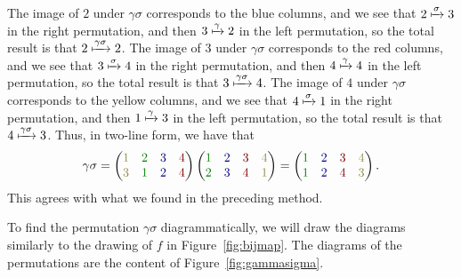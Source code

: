 \begin{example}
\[    \]
    The image of $2$ under $\gamma\sigma$ corresponds to the blue columns, and we see that $2 \xmapsto{\sigma} 3$ in the right permutation, and then $3 \xmapsto{\gamma} 2$ in the left permutation, so the total result is that $2 \xmapsto{\gamma\sigma} 2$. The image of $3$ under $\gamma\sigma$ corresponds to the red columns, and we see that $3 \xmapsto{\sigma} 4$ in the right permutation, and then $4 \xmapsto{\gamma} 4$ in the left permutation, so the total result is that $3 \xmapsto{\gamma\sigma} 4$. The image of $4$ under $\gamma\sigma$ corresponds to the yellow columns, and we see that $4 \xmapsto{\sigma} 1$ in the right permutation, and then $1 \xmapsto{\gamma} 3$ in the left permutation, so the total result is that $4 \xmapsto{\gamma\sigma} 3$. Thus, in two-line form, we have that
    \[
    \gamma\sigma = \begin{pmatrix}
        \textcolor{yellow!50!black}{1} & \textcolor{green!50!black}{2} & \textcolor{blue!50!black}{3} & \textcolor{red!50!black}{4} \\
        \textcolor{yellow!50!black}{3} & \textcolor{green!50!black}{1} & \textcolor{blue!50!black}{2} & \textcolor{red!50!black}{4} \\
    \end{pmatrix}\begin{pmatrix}
        \textcolor{green!50!black}{1} & \textcolor{blue!50!black}{2} & \textcolor{red!50!black}{3} & \textcolor{yellow!50!black}{4} \\
        \textcolor{green!50!black}{2} & \textcolor{blue!50!black}{3} & \textcolor{red!50!black}{4} & \textcolor{yellow!50!black}{1} \\
    \end{pmatrix} = \begin{pmatrix}
        \textcolor{green!50!black}{1} & \textcolor{blue!50!black}{2} & \textcolor{red!50!black}{3} & \textcolor{yellow!50!black}{4} \\
        \textcolor{green!50!black}{1} & \textcolor{blue!50!black}{2} & \textcolor{red!50!black}{4} & \textcolor{yellow!50!black}{3} \\
    \end{pmatrix}.
    \]
    This agrees with what we found in the preceding method.

     To find the permutation $\gamma\sigma$ diagrammatically, we will draw the diagrams similarly to the drawing of $f$ in Figure~\ref{fig:bijmap}. The diagrams of the permutations are the content of Figure~\ref{fig:gammasigma}.


\end{example}
